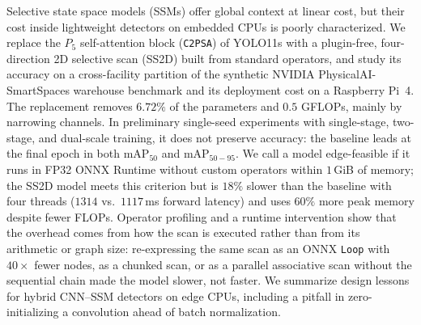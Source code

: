 Selective state space models (SSMs) offer global context at linear cost, but their cost inside lightweight detectors on embedded CPUs is poorly characterized. We replace the $P_5$ self-attention block (\texttt{C2PSA}) of YOLO11s with a plugin-free, four-direction 2D selective scan (SS2D) built from standard operators, and study its accuracy on a cross-facility partition of the synthetic NVIDIA PhysicalAI-SmartSpaces warehouse benchmark and its deployment cost on a Raspberry Pi~4. The replacement removes $6.72\%$ of the parameters and $0.5$ GFLOPs, mainly by narrowing channels. In preliminary single-seed experiments with single-stage, two-stage, and dual-scale training, it does not preserve accuracy: the baseline leads at the final epoch in both $\text{mAP}_{50}$ and $\text{mAP}_{50-95}$. We call a model edge-feasible if it runs in FP32 ONNX Runtime without custom operators within $1$\,GiB of memory; the SS2D model meets this criterion but is $18\%$ slower than the baseline with four threads ($1314$ vs.\ $1117$\,ms forward latency) and uses $60\%$ more peak memory despite fewer FLOPs. Operator profiling and a runtime intervention show that the overhead comes from how the scan is executed rather than from its arithmetic or graph size: re-expressing the same scan as an ONNX \texttt{Loop} with $40\times$ fewer nodes, as a chunked scan, or as a parallel associative scan without the sequential chain made the model slower, not faster. We summarize design lessons for hybrid CNN--SSM detectors on edge CPUs, including a pitfall in zero-initializing a convolution ahead of batch normalization.
